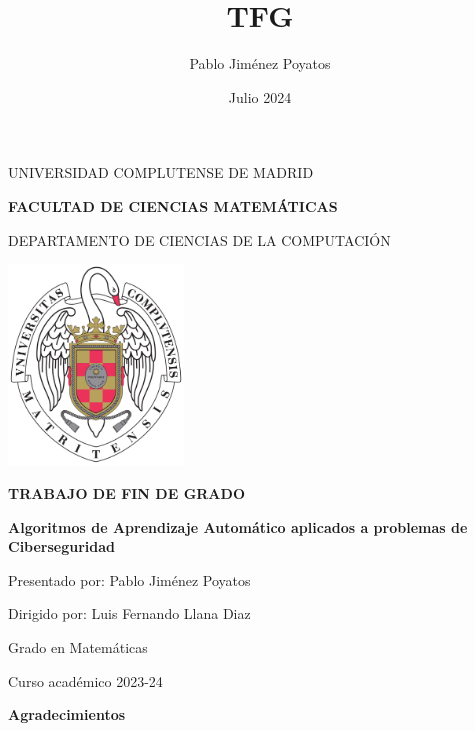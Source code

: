 \documentclass[12pt,a4paper]{book}
\author{Pablo Jiménez Poyatos}
\title{TFG}
\date{Julio 2024}
\begin{document}


\begin{titlepage}
		\centering
		
		{ \Large UNIVERSIDAD COMPLUTENSE DE MADRID}
		
		{ \Large \textbf{FACULTAD DE CIENCIAS MATEMÁTICAS}}
		\vspace{0.8cm}
		
		{ \large DEPARTAMENTO DE CIENCIAS DE LA  COMPUTACIÓN}
		\vspace{1cm}
		
		\vspace{0.6cm}
		
		\graphicspath{ {images/} }
		\includegraphics[width=0.35\textwidth]{img/ucm.png} 
		\vspace{0.4cm}
		
        {\Large \textbf{TRABAJO DE FIN DE GRADO}}
		
		\vspace{8mm}
        {\huge \bfseries Algoritmos de Aprendizaje Automático aplicados a problemas de Ciberseguridad\par}
		\vspace{1cm}

		{\large Presentado por: Pablo Jiménez Poyatos}
		
		{\large Dirigido por: Luis Fernando Llana Diaz}
		
		\vspace{1.5cm}
		{\large Grado en Matemáticas}
		
		{\large Curso académico 2023-24}
\end{titlepage}

\thispagestyle{empty}
\clearpage
\setcounter{page}{1}


\newpage
\begin{center}
   {\bf Agradecimientos} 
\end{center}
\end{document}
